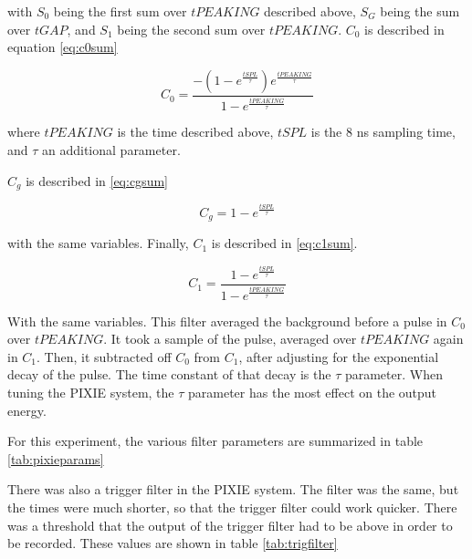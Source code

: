 \documentclass[main.tex]{subfiles}
\begin{document}
with $S_{0}$ being the first sum over $tPEAKING$ described above, $S_{G}$ being the sum over $tGAP$, and $S_{1}$ being the second sum over $tPEAKING$.
$C_{0}$ is described in equation \ref{eq:c0sum}

\begin{equation}
	C_{0} = \frac{-(1 - e^{\frac{tSPL}{\tau}})e^{\frac{tPEAKING}{\tau}}}{1 - e^{\frac{tPEAKING}{\tau}}}
	\label{eq:c0sum}
\end{equation}

where $tPEAKING$ is the time described above, $tSPL$ is the 8 ns sampling time, and $\tau$ an additional parameter.

$C_{g}$ is described in \ref{eq:cgsum}

\begin{equation}
	C_{g} = 1 - e^{\frac{tSPL}{\tau}}
	\label{eq:cgsum}
\end{equation}

with the same variables.
Finally, $C_{1}$ is described in \ref{eq:c1sum}.

\begin{equation}
	C_{1} = \frac{1 - e^{\frac{tSPL}{\tau}}}{1 - e^{\frac{tPEAKING}{\tau}}}
	\label{eq:c1sum}
\end{equation}

With the same variables.
This filter averaged the background before a pulse in $C_{0}$ over $tPEAKING$.
It took a sample of the pulse, averaged over $tPEAKING$ again in $C_{1}$.
Then, it subtracted off $C_{0}$ from $C_{1}$, after adjusting for the exponential decay of the pulse.
The time constant of that decay is the $\tau$ parameter.
When tuning the PIXIE system, the $\tau$ parameter has the most effect on the output energy.

For this experiment, the various filter parameters are summarized in table \ref{tab:pixieparams}  
%
\begin{table}[!hbt]
	\centering
	\caption{Energy Filter Parameters}
			\label{tab:pixieparams}
\end{table}
%

There was also a trigger filter in the PIXIE system.
The filter was the same, but the times were much shorter, so that the trigger filter could work quicker. 
There was a threshold that the output of the trigger filter had to be above in order to be recorded.
These values are shown in table \ref{tab:trigfilter}
\end{document}
